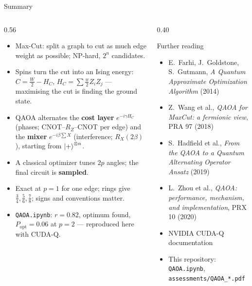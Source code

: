 \documentclass[aspectratio=169,11pt]{beamer}
\newcommand{\key}[1]{{\color{qdark}\textbf{#1}}}
\begin{document}
\begin{frame}{Summary}
  \begin{columns}[T]
    \begin{column}{0.56\textwidth}
      \footnotesize
      \begin{itemize}\itemsep1pt
        \item Max-Cut: split a graph to cut as much edge weight as possible; NP-hard, $2^n$ candidates.
        \item Spins turn the cut into an Ising energy: $C = \frac W2 - H_C$, $H_C = \sum\frac{w}{2}Z_iZ_j$ --- maximising the cut is
          finding the ground state.
        \item QAOA alternates the \key{cost layer} $e^{-i\gamma H_C}$ (phases; CNOT--$R_Z$--CNOT per edge) and the \key{mixer}
          $e^{-i\beta\sum X}$ (interference; $R_X(2\beta)$), starting from $\ket+^{\otimes n}$.
        \item A classical optimizer tunes $2p$ angles; the final circuit is \key{sampled}.
        \item Exact at $p = 1$ for one edge; rings give $\frac34, \frac56, \frac78$; signs and conventions matter.
        \item \texttt{QAOA.ipynb}: $r = 0.82$, optimum found, $P_{\text{opt}} = 0.06$ at $p = 2$ --- reproduced here with CUDA-Q.
      \end{itemize}
    \end{column}
    \begin{column}{0.40\textwidth}
      \begin{block}{Further reading}
        \scriptsize
        \begin{itemize}\itemsep0pt
          \item E.\ Farhi, J.\ Goldstone, S.\ Gutmann, \emph{A Quantum Approximate Optimization Algorithm} (2014)
          \item Z.\ Wang et al., \emph{QAOA for MaxCut: a fermionic view}, PRA 97 (2018)
          \item S.\ Hadfield et al., \emph{From the QAOA to a Quantum Alternating Operator Ansatz} (2019)
          \item L.\ Zhou et al., \emph{QAOA: performance, mechanism, and implementation}, PRX 10 (2020)
          \item NVIDIA CUDA-Q documentation
          \item This repository: \texttt{QAOA.ipynb}, \texttt{assessments/QAOA\_*.pdf}
        \end{itemize}
      \end{block}
    \end{column}
  \end{columns}
\end{frame}
\end{document}
